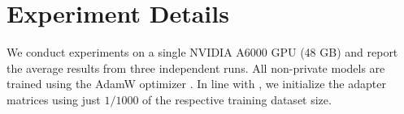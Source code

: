 




\section{Experiment Details} \label{app:hyperparams}

We conduct experiments on a single NVIDIA A6000 GPU (48 GB) and report the average results from three independent runs. All non-private models are trained using the AdamW optimizer \citep{loshchilov2019decoupledweightdecayregularization}. 
In line with \citet{ponkshe2024initialization}, we initialize the adapter matrices using just $1/{1000}$ of the respective training dataset size.
\\

